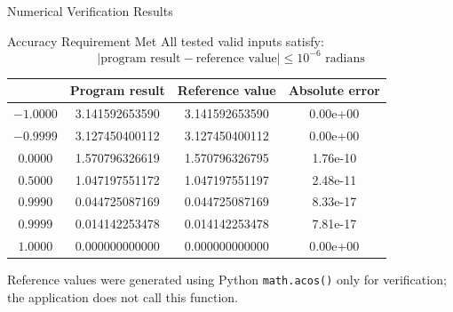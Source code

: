 \documentclass[aspectratio=169]{beamer}
\newcommand{\tableheader}[1]{%
    \multicolumn{1}{c}{\color{white}\textbf{#1}}%
}
\begin{document}
\begin{frame}{Numerical Verification Results}
\centering

\begin{exampleblock}{Accuracy Requirement Met}
All tested valid inputs satisfy:
\[
\left|\text{program result}-\text{reference value}\right|
\leq 10^{-6}\text{ radians}
\]
\end{exampleblock}

\vspace{0.10cm}

\scriptsize
{}
\begin{tabular}{c c c c}
\rowcolor{navy}
\tableheader{Input \(x\)} &
\tableheader{Program result} &
\tableheader{Reference value} &
\tableheader{Absolute error} \\
\toprule
\(-1.0000\) & 3.141592653590 & 3.141592653590 & 0.00e+00 \\
\(-0.9999\) & 3.127450400112 & 3.127450400112 & 0.00e+00 \\
\(0.0000\) & 1.570796326619 & 1.570796326795 & 1.76e-10 \\
\(0.5000\) & 1.047197551172 & 1.047197551197 & 2.48e-11 \\
\(0.9990\) & 0.044725087169 & 0.044725087169 & 8.33e-17 \\
\(0.9999\) & 0.014142253478 & 0.014142253478 & 7.81e-17 \\
\(1.0000\) & 0.000000000000 & 0.000000000000 & 0.00e+00 \\
\bottomrule
\end{tabular}

\vspace{0.18cm}

\scriptsize
Reference values were generated using Python \texttt{math.acos()} only for
verification; the application does not call this function.
\end{frame}
\end{document}
